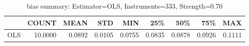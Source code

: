 \begin{table}[ht]
\centering
\caption{bias summary: Estimator=OLS, Instruments=333, Strength=0.70}
\begin{tabular}{lrrrrrrrr}
\toprule
 & COUNT & MEAN & STD & MIN & 25\% & 50\% & 75\% & MAX \\
\midrule
OLS & 10.0000 & 0.0892 & 0.0105 & 0.0755 & 0.0835 & 0.0878 & 0.0926 & 0.1111 \\
\bottomrule
\end{tabular}
\end{table}
